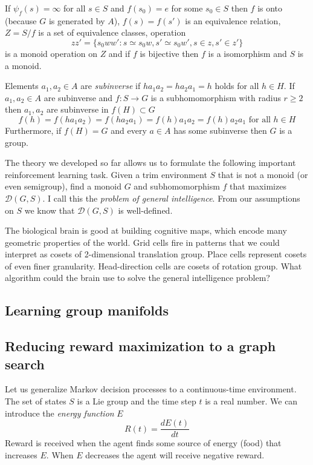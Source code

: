 \documentclass[12pt]{article}
\begin{document}
If $\psi_f(s)=\infty$ for all $s\in S$ and $f(s_0)=e$ for some $s_0\in S$ then $f$ is onto (because $G$ is generated by $A$), $f(s)=f(s')$ is an equivalence relation, $Z=S/f$ is a set of equivalence classes, operation \[
zz'=\{s_0ww':s\simeq s_0w, s'\simeq s_0w', s\in z, s' \in z'\}
\] 
is a monoid operation on $Z$ and if $f$ is bijective then $f$ is a isomorphism and $S$ is a monoid.

Elements $a_1,a_2\in A$ are \textit{subinverse} if $ha_1a_2=ha_2a_1=h$ holds for all $h\in H$. If $a_1,a_2\in A$ are subinverse and $f:S\rightarrow G$ is a subhomomorphism with radius $r\ge 2$ then $a_1,a_2$ are subinverse in $f(H)\subset G$
\[
f(h)=f(ha_1a_2)=f(ha_2a_1)=f(h)a_1a_2=f(h)a_2a_1\text{ for all }h\in H
\]
Furthermore, if $f(H)=G$ and every $a\in A$ has some subinverse then $G$ is a group.


The theory we developed so far allows us to formulate the following important reinforcement learning task. Given a trim environment $S$ that is not a monoid (or even semigroup), find a monoid $G$ and subhomomorphism $f$ that maximizes $\mathcal{D}(G,S)$. 
I call this the \textit{problem of general intelligence}. From our assumptions on $S$ we know that $\mathcal{D}(G,S)$ is well-defined. 

The biological brain is good at building cognitive maps, which encode many geometric properties of the world. Grid cells fire in patterns that we could interpret as cosets of 2-dimensional translation group. Place cells represent cosets of even finer granularity. Head-direction cells are cosets of rotation group. What algorithm could the brain use to solve the general intelligence problem?



\subsection{Learning group manifolds}

\subsection{Reducing reward maximization to a graph search}

Let us generalize Markov decision processes to a continuous-time environment. The set of states $S$ is a Lie group and the time step $t$ is a real number. We can introduce the \textit{energy function} $E$
\[
R(t) = \frac{dE(t)}{dt}
\]
Reward is received when the agent finds some source of energy (food) that increases $E$. When $E$ decreases the agent will receive negative reward. 
\end{document}
